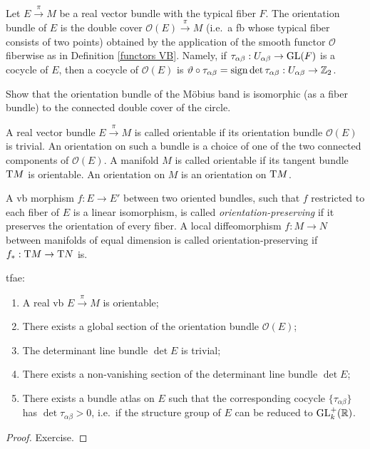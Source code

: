\begin{defn}
    Let $E\overset\pi\to M$ be a real vector bundle with the typical fiber $F$. The orientation bundle of $E$ is the double cover $\mathcal{O}(E)\overset{\pi}\to M$ (i.e.\ a \gls{fb} whose typical fiber consists of two points) obtained by the application of the smooth functor $\mathcal{O}$ fiberwise as in Definition \ref{functors VB}. Namely, if $\tau_{\alpha\beta}:U_{\alpha\beta}\to\operatorname{GL}(F)$ is a cocycle of $E$, then a cocycle of $\mathcal{O}(E)$ is $\vartheta\circ\tau_{\alpha\beta}=\operatorname{sign}\det\tau_{\alpha\beta}:U_{\alpha\beta}\to\mathbb{Z}_2$.
\end{defn}

\begin{xca}
    Show that the orientation bundle of the M\"obius band is isomorphic (as a fiber bundle) to the connected double cover of the circle.
\end{xca}

\begin{defn}
    A real vector bundle $E\overset\pi\to M$ is called orientable if its orientation bundle $\mathcal{O}(E)$ is trivial. An orientation on such a bundle is a choice of one of the two connected components of $\mathcal{O}(E)$. A manifold $M$ is called orientable if its tangent bundle $\mathrm{T} M$ is orientable. An orientation on $M$ is an orientation on $\mathrm{T} M$.

    A \gls{vb} morphism $f:E\to E'$ between two oriented bundles, such that $f$ restricted to each fiber of $E$ is a linear isomorphism, is called \emph{orientation-preserving} if it preserves the orientation of every fiber. A local diffeomorphism $f:M\to N$ between manifolds of equal dimension is called orientation-preserving if $f_\ast:\mathrm{T} M\to \mathrm{T} N$ is.
\end{defn}

\begin{prop}\label{prop orientation}
\gls{tfae}:
\begin{enumerate}
    \item A real \gls{vb} $E\overset\pi\to M$ is orientable;
    \item There exists a global section of the orientation bundle $\mathcal{O}(E)$;
    \item The determinant line bundle $\det E$ is trivial;
    \item There exists a non-vanishing section of the determinant line bundle $\det E$;
    \item There exists a bundle atlas on $E$ such that the corresponding cocycle $\{\tau_{\alpha\beta}\}$ has $\det\tau_{\alpha\beta}>0$, i.e.\ if the structure group of $E$ can be reduced to $\operatorname{GL}^+_k(\mathbb{R} )$.
\end{enumerate}
\end{prop}
\begin{proof}
    Exercise.
\end{proof}

